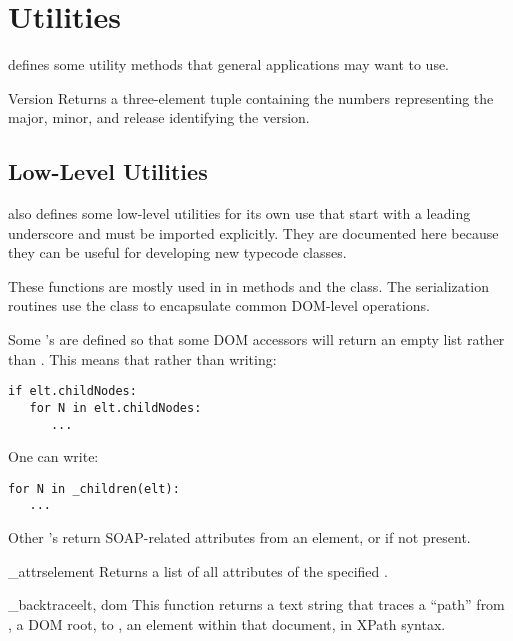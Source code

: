 \chapter{Utilities}

\ZSI{} defines some utility methods that general applications
may want to use.

\begin{funcdesc}{Version}{}
Returns a three-element tuple containing the numbers representing the
major, minor, and release identifying the \ZSI{} version.
\end{funcdesc}

\section{Low-Level Utilities}

\ZSI{} also defines some low-level utilities for its own use that
start with a leading underscore and must be imported explicitly.
They are documented here because they can be useful for developing
new typecode classes.

These functions are mostly used in in  methods and the
 class.  The serialization routines use the
 class to encapsulate common DOM-level operations.

Some 's are defined so that some DOM accessors
will return an empty list rather than .
This means that rather than writing:
\begin{verbatim}
if elt.childNodes:
   for N in elt.childNodes:
      ...
\end{verbatim}
One can write:
\begin{verbatim}
for N in _children(elt):
   ...
\end{verbatim}

Other 's return SOAP-related attributes from an element,
or  if not present.


\begin{funcdesc}{_attrs}{element}
Returns a list of all attributes of the specified .
\end{funcdesc}

\begin{funcdesc}{_backtrace}{elt, dom}
This function returns a text string that traces a ``path'' from ,
a DOM root, to , an element within that document, in
XPath syntax.
\end{funcdesc}

